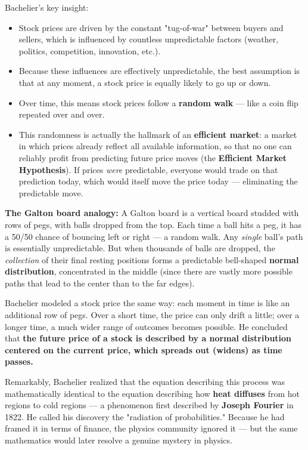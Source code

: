\documentclass[12pt,openany]{book}
\theoremstyle{definition}
\theoremstyle{remark}
\begin{document}
Bachelier's key insight:

\begin{itemize}
\item Stock prices are driven by the constant "tug-of-war" between buyers and sellers, which is influenced by countless unpredictable factors (weather, politics, competition, innovation, etc.).


\item Because these influences are effectively unpredictable, the best assumption is that at any moment, a stock price is equally likely to go up or down.


\item Over time, this means stock prices follow a \textbf{random walk} --- like a coin flip repeated over and over.


\item This randomness is actually the hallmark of an \textbf{efficient market}: a market in which prices already reflect all available information, so that no one can reliably profit from predicting future price moves (the \textbf{Efficient Market Hypothesis}). If prices \emph{were} predictable, everyone would trade on that prediction today, which would itself move the price today --- eliminating the predictable move.


\end{itemize}

\textbf{The Galton board analogy:} A Galton board is a vertical board studded with rows of pegs, with balls dropped from the top. Each time a ball hits a peg, it has a 50/50 chance of bouncing left or right --- a random walk. Any \emph{single} ball's path is essentially unpredictable. But when thousands of balls are dropped, the \emph{collection} of their final resting positions forms a predictable bell-shaped \textbf{normal distribution}, concentrated in the middle (since there are vastly more possible paths that lead to the center than to the far edges).

Bachelier modeled a stock price the same way: each moment in time is like an additional row of pegs. Over a short time, the price can only drift a little; over a longer time, a much wider range of outcomes becomes possible. He concluded that \textbf{the future price of a stock is described by a normal distribution centered on the current price, which spreads out (widens) as time passes.}

Remarkably, Bachelier realized that the equation describing this process was mathematically identical to the equation describing how \textbf{heat diffuses} from hot regions to cold regions --- a phenomenon first described by \textbf{Joseph Fourier} in 1822. He called his discovery the "radiation of probabilities." Because he had framed it in terms of finance, the physics community ignored it --- but the same mathematics would later resolve a genuine mystery in physics.
\end{document}
